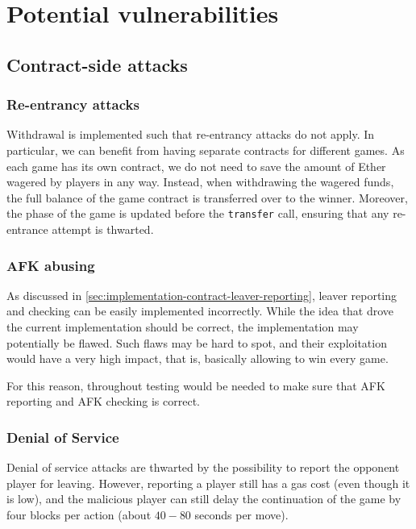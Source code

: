 \section{Potential vulnerabilities}
\label{sec:potential_vulnerabilities}

\subsection{Contract-side attacks}
\subsubsection{Re-entrancy attacks}
Withdrawal is implemented such that re-entrancy attacks do not apply. In
particular, we can benefit from having separate contracts for different games.
As each game has its own contract, we do not need to save the amount of Ether
wagered by players in any way. Instead, when withdrawing the wagered funds, the
full balance of the game contract is transferred over to the winner. Moreover,
the phase of the game is updated before the \texttt{transfer}
call, ensuring that any re-entrance attempt is thwarted.

\subsubsection{AFK abusing}
As discussed in \cref{sec:implementation-contract-leaver-reporting}, leaver
reporting and checking can be easily implemented incorrectly. While the idea
that drove the current implementation should be correct, the implementation may
potentially be flawed. Such flaws may be hard to spot, and their exploitation
would have a very high impact, that is, basically allowing to win every game.

For this reason, throughout testing would be needed to make sure that AFK
reporting and AFK checking is correct.

\subsubsection{Denial of Service}
Denial of service attacks are thwarted by the possibility to report the
opponent player for leaving. However, reporting a player still has a gas cost
(even though it is low), and the malicious player can still delay the
continuation of the game by four blocks per action (about $40 - 80$ seconds per
move).

